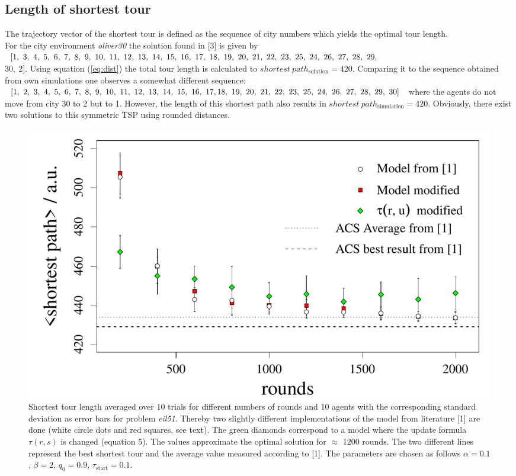 \subsection{Length of shortest tour}
The trajectory vector of the shortest tour is defined as the sequence of city numbers which yields the optimal tour length.\\
For the city environment \emph{oliver30} the solution found in [3] is given by $[1,~3,~  4,~  5,~  6,~  7,\\~  8,~  9,~  10,~  11,~  12,~  13,~  14,~  15,~  16,~  17,~  18,~  19,~  20,~  21,~  22,~  23,~  25,~  24,~  26,~  27,~  28,~  29,$\\$  30,~  2]$. Using equation (\ref{eq:dist}) the total tour length is calculated to $shortest~path_\text{solution} = 420$. Comparing it to the sequence obtained from own simulations one observes a somewhat different sequence: $[1, ~2,~3,~  4,~  5,~  6,~  7,~  8,~  9,~  10,~  11,~  12,~  13,~  14,~  15,~  16,~  17,\\  18,~  19,~  20,~  21,~  22,~  23,~  25,~  24,~  26,~  27,~  28,~  29,~  30]$ where the agents do not move from city 30 to 2 but to 1. However, the length of this shortest path also results in $shortest~ path_\text{simulation}=420$. Obviously, there exist two solutions to this symmetric TSP using rounded distances.\\
\begin{figure}[H]
\begin{center}
\includegraphics[width= 1\linewidth]{rounds_vs_shortestpath_eil}
\caption{Shortest tour length averaged over 10 trials for different numbers of rounds and 10 agents with the corresponding standard deviation as error bars for problem \textit{eil51}. Thereby two slightly different implementations of the model from literature [1] are done (white circle dots and red squares, see text). The green diamonds correspond to a model where the update formula $\tau(r,s)$ is changed (equation 5). The values approximate the optimal solution for $\approx$ 1200 rounds. The two different lines represent the best shortest tour and the average value measured according to [1]. The parameters are chosen as follows $\alpha=0.1$, $\beta=2$, $q_0=0.9$, $\tau_\text{start}=0.1$.}
\label{fig:roundspeil}
\end{center}
\end{figure}
